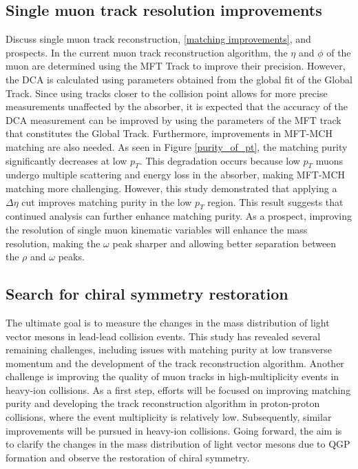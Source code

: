     \subsection{Single muon track resolution improvements}   
        Discuss single muon track reconstruction, \ref{matching improvements}, and prospects. In the current muon track reconstruction algorithm, the \(\eta\) and \(\phi\) of the muon are determined using the MFT Track to improve their precision. However, the DCA is calculated using parameters obtained from the global fit of the Global Track. Since using tracks closer to the collision point allows for more precise measurements unaffected by the absorber, it is expected that the accuracy of the DCA measurement can be improved by using the parameters of the MFT track that constitutes the Global Track. Furthermore, improvements in MFT-MCH matching are also needed. As seen in Figure \ref{purity_of_pt}, the matching purity significantly decreases at low \( p_T \). This degradation occurs because low \( p_T \) muons undergo multiple scattering and energy loss in the absorber, making MFT-MCH matching more challenging. However, this study demonstrated that applying a \( \Delta \eta \) cut improves matching purity in the low \( p_T \) region. This result suggests that continued analysis can further enhance matching purity.
        As a prospect, improving the resolution of single muon kinematic variables will enhance the mass resolution, making the $\omega$ peak sharper and allowing better separation between the $\rho$ and $\omega$ peaks.  
    
    \subsection{Search for chiral symmetry restoration}
    The ultimate goal is to measure the changes in the mass distribution of light vector mesons in lead-lead collision events. This study has revealed several remaining challenges, including issues with matching purity at low transverse momentum and the development of the track reconstruction algorithm. Another challenge is improving the quality of muon tracks in high-multiplicity events in heavy-ion collisions. As a first step, efforts will be focused on improving matching purity and developing the track reconstruction algorithm in proton-proton collisions, where the event multiplicity is relatively low. 
    Subsequently, similar improvements will be pursued in heavy-ion collisions. 
    Going forward, the aim is to clarify the changes in the mass distribution of light vector mesons due to QGP formation and observe the restoration of chiral symmetry.
